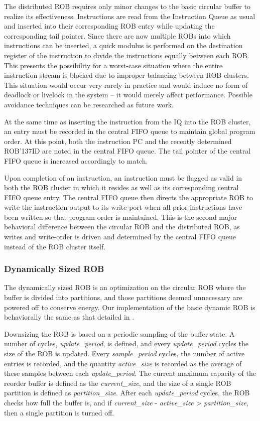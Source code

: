The distributed ROB requires only minor changes to the basic circular buffer to realize its effectiveness.  Instructions are 
read from the Instruction Queue as usual and inserted into their corresponding ROB entry while updating the corresponding tail 
pointer.  Since there are now multiple ROBs into which instructions can be inserted, a quick modulus is performed on the 
destination register of the instruction to divide the instructions equally between each ROB.  This presents the possibility 
for a worst-case situation where the entire instruction stream is blocked due to improper balancing between ROB clusters.  
This situation would occur very rarely in practice and would induce no form of deadlock or livelock in the system -- 
it would merely affect performance.  Possible avoidance techniques can be researched as future work.

At the same time as inserting the instruction from the IQ into the ROB cluster, an entry must be recorded in the central FIFO 
queue to maintain global program order.  At this point, both the instruction PC and the recently determined ROB{\char'137}ID are 
noted in the central FIFO queue.  The tail pointer of the central FIFO queue is increased accordingly to match.

Upon completion of an instruction, an instruction must be flagged as valid in both the ROB cluster in which it resides as well 
as its corresponding central FIFO queue entry.  The central FIFO queue then directs the appropriate ROB to write the instruction 
output to its write port when all prior instructions have been written so that program order is maintained.  This is the second 
major behavioral difference between the circular ROB and the distributed ROB, as writes and write-order is driven and determined by 
the central FIFO queue instead of the ROB cluster itself. 

\subsubsection{Dynamically Sized ROB}
The dynamically sized ROB is an optimization on the circular ROB where the buffer is divided into partitions, and those partitions deemed unnecessary are powered off to conserve energy. Our implementation of the basic dynamic ROB is behaviorally the same as that detailed in \cite{kucuk2}.

Downsizing the ROB is based on a periodic sampling of the buffer state. A number of cycles, {\it update\_period}, is defined, and every {\it update\_period} cycles the size of the ROB is updated. Every {\it sample\_period} cycles, the number of active entries is recorded, and the quantity {\it active\_size} is recorded as the average of these samples between each {\it update\_period}. The current maximum capacity of the reorder buffer is defined as the {\it current\_size}, and the size of a single ROB partition is defined as {\it partition\_size}. After each {\it update\_period} cycles, the ROB checks how full the buffer is, and if {\it current\_size} - {\it active\_size} > {\it partition\_size}, then a single partition is turned off.

